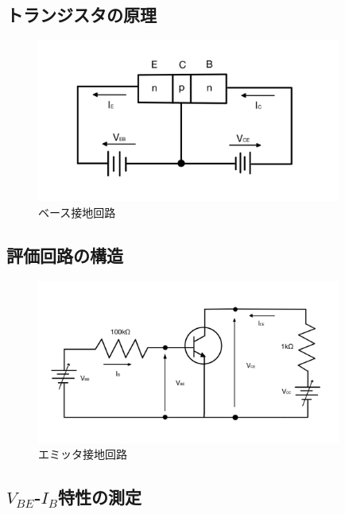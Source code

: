 \documentclass[titlepage]{jarticle}
\begin{document}
\subsection{トランジスタの原理}
\begin{figure}[H]
    \begin{center}
        \includegraphics[width=10cm]{image/tr.jpg}
        \caption{ベース接地回路}
        \label{fig:ベース接地回路}
    \end{center}
\end{figure}

\subsection{評価回路の構造}
\begin{figure}[H]
    \begin{center}
        \includegraphics[width=10cm]{image/emitter.jpg}
        \caption{エミッタ接地回路}
        \label{fig:エミッタ接地回路}
    \end{center}
\end{figure}

\subsection{$V_{BE}$-$I_B$特性の測定}
\end{document}
